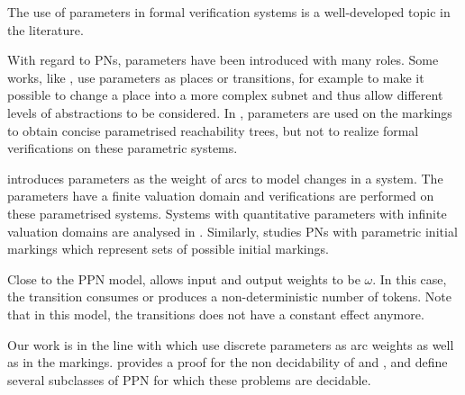 The use of parameters in formal verification systems is a well-developed topic in the literature.

With regard  to \acp{PN}, parameters have been introduced with many roles.
Some works, like \cite{Christensen97}, use parameters as places or transitions, for example to make it possible to change a place into a more complex subnet and thus allow different levels of abstractions to be considered.
In \cite{Lindqvist91}, parameters are used on the markings to obtain concise parametrised reachability trees, but not to realize formal verifications on these parametric systems.

\cite{Badouel99} introduces parameters as the weight of arcs to model changes in a system.
The parameters have a finite valuation domain and verifications are performed on these parametrised systems.
Systems with quantitative parameters with infinite valuation domains are analysed in \cite{Abdulla13}.
Similarly, \cite{Marsan94} studies \acp{PN} with parametric initial markings which represent sets of possible initial markings.

Close to the \ac{PPN} model, \opn \citep{Geeraerts15} allows input and output weights to be $\omega$. In this case, the transition consumes or produces a non-deterministic number of tokens. Note that in this model, the transitions does not have a constant effect anymore.

Our work is in the line with \cite{David17} which use discrete parameters as arc weights as well as in the markings.
\cite{David17} provides a proof for the non decidability of \Ucov and \Ecov, and define several subclasses of \ac{PPN} for which these problems are decidable.
